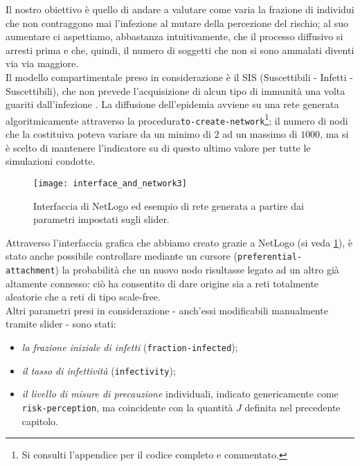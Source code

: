 Il nostro obiettivo è quello di andare a valutare come varia la frazione di individui che non contraggono mai l'infezione al mutare della percezione del rischio; al suo aumentare ci aspettiamo, abbastanza intuitivamente, che il processo diffusivo si arresti prima e che, quindi, il numero di soggetti che non si sono ammalati diventi via via maggiore. \\Il modello compartimentale preso in considerazione è il SIS (Suscettibili - Infetti - Suscettibili), che non prevede l'acquisizione di alcun tipo di immunità una volta guariti dall'infezione \cite{Brauer}. 
La diffusione dell'epidemia avviene su una rete generata algoritmicamente attraverso la procedura\texttt{to-create-network}\footnote{Si consulti l'appendice per il codice completo e commentato.}; il numero di nodi che la costituiva poteva variare da un minimo di $ 2 $ ad un massimo di $ 1000 $, ma si è scelto di mantenere l'indicatore su di questo ultimo valore per tutte le simulazioni condotte.
\begin{figure}[h]
		\begin{center}
			\texttt{[image: interface\_and\_network3]}
			\caption{Interfaccia di NetLogo ed esempio di rete generata a partire dai parametri impostati sugli slider.}
			\label{fig:NetLogo1}
		\end{center}
\end{figure}
Attraverso l'interfaccia grafica che abbiamo creato grazie a NetLogo (si veda \cref{fig:NetLogo1}), è stato anche possibile controllare mediante un cursore (\texttt{preferential-attachment}) la probabilità che un nuovo nodo risultasse legato ad un altro già altamente connesso: ciò ha consentito di dare origine sia a reti totalmente aleatorie che a reti di tipo scale-free. \\Altri parametri presi in considerazione - anch'essi modificabili manualmente tramite slider - sono stati:
\begin{itemize}
\item \textit{la frazione iniziale di infetti} (\texttt{fraction-infected});
\item \textit{il tasso di infettività} (\texttt{infectivity});
\item \textit{il livello di misure di precauzione} individuali, indicato genericamente come \texttt{risk-perception}, ma coincidente con la quantità $ J $ definita nel precedente capitolo.
\end{itemize}
